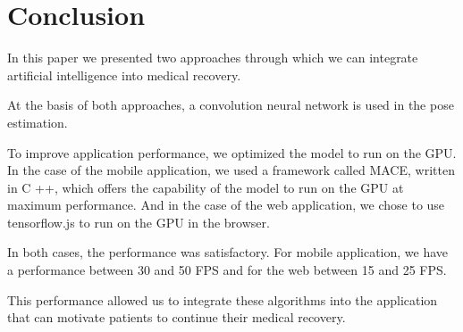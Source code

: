 
\chapter{Conclusion}

In this paper we presented two approaches through which we can integrate artificial intelligence into medical recovery.

 At the basis of both approaches, a convolution neural network  is used in the pose estimation.
 
 
To improve application performance, we optimized the model to run on the GPU.
In the case of the mobile application, we used a framework called MACE, written in C ++, which offers the capability of the model to run on the GPU at maximum performance.
And in the case of the web application, we chose to use tensorflow.js to run on the GPU in the browser.

In both cases, the performance was satisfactory. For mobile application, we have a performance between 30 and 50 FPS and for the web between 15 and 25 FPS.
 
 This performance allowed us to integrate these algorithms into the application that can motivate patients to continue their medical recovery.
 
